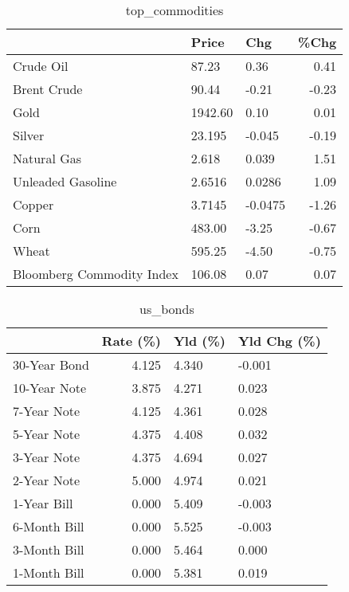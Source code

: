 \documentclass{article}%
\begin{document}
\begin{table}[htbp]%
\caption{top\_commodities}%
\centering%
\begin{adjustbox}{width=1\textwidth}%
\begin{tabular}{lllr}
\toprule
                          &   Price &     Chg &  \%Chg \\
\midrule
               Crude Oil  &   87.23 &    0.36 &  0.41 \\
             Brent Crude  &   90.44 &   -0.21 & -0.23 \\
                    Gold  & 1942.60 &    0.10 &  0.01 \\
                  Silver  &  23.195 &  -0.045 & -0.19 \\
             Natural Gas  &   2.618 &   0.039 &  1.51 \\
       Unleaded Gasoline  &  2.6516 &  0.0286 &  1.09 \\
                  Copper  &  3.7145 & -0.0475 & -1.26 \\
                    Corn  &  483.00 &   -3.25 & -0.67 \\
                   Wheat  &  595.25 &   -4.50 & -0.75 \\
Bloomberg Commodity Index &  106.08 &    0.07 &  0.07 \\
\bottomrule
\end{tabular}
%
\end{adjustbox}%
\end{table}

%


\begin{table}[htbp]%
\caption{us\_bonds}%
\centering%
\begin{adjustbox}{width=1\textwidth}%
\begin{tabular}{lrll}
\toprule
             &  Rate (\%) & Yld (\%) & Yld Chg (\%) \\
\midrule
30-Year Bond &     4.125 &   4.340 &      -0.001 \\
10-Year Note &     3.875 &   4.271 &       0.023 \\
 7-Year Note &     4.125 &   4.361 &       0.028 \\
 5-Year Note &     4.375 &   4.408 &       0.032 \\
 3-Year Note &     4.375 &   4.694 &       0.027 \\
 2-Year Note &     5.000 &   4.974 &       0.021 \\
 1-Year Bill &     0.000 &   5.409 &      -0.003 \\
6-Month Bill &     0.000 &   5.525 &      -0.003 \\
3-Month Bill &     0.000 &   5.464 &       0.000 \\
1-Month Bill &     0.000 &   5.381 &       0.019 \\
\bottomrule
\end{tabular}
%
\end{adjustbox}%
\end{table}
\end{document}
